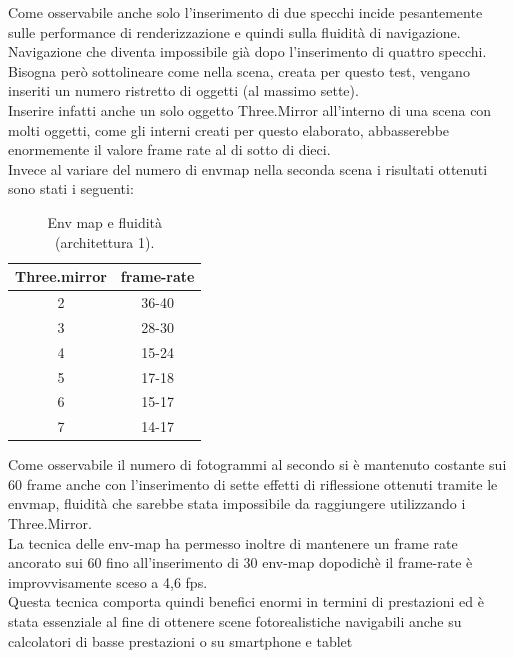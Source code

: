 Come osservabile anche solo l’inserimento di due specchi incide pesantemente sulle performance di renderizzazione e quindi sulla fluidità di navigazione.
\\
Navigazione che diventa impossibile già dopo l’inserimento di quattro specchi.
Bisogna però sottolineare come nella scena, creata per questo test, vengano inseriti un numero ristretto di oggetti (al massimo sette).
\\
Inserire infatti anche un solo oggetto Three.Mirror all’interno di una scena con molti oggetti, come gli interni creati per questo elaborato, abbasserebbe enormemente il valore frame rate al di sotto di dieci.
\\
Invece al variare del numero di envmap nella seconda scena i risultati ottenuti sono stati i seguenti:
\begin{table}[h]
\centering
\caption{Env map e fluidità (architettura 1).}
\begin{tabular}{|c|c|}
\hline
\textbf{Three.mirror} & \textbf{frame-rate} \\ \hline
2 & 36-40 \\ \hline
3 & 28-30 \\ \hline
4 & 15-24 \\ \hline
5 & 17-18 \\ \hline
6 & 15-17 \\ \hline
7 & 14-17 \\ \hline
\end{tabular}
\label{table:env-map}
\end{table}
Come osservabile il numero di fotogrammi al secondo si è mantenuto costante sui 60 frame anche con l’inserimento di sette effetti di riflessione ottenuti tramite le envmap, fluidità che sarebbe stata impossibile da raggiungere utilizzando i Three.Mirror.
\\
La tecnica delle env-map ha permesso inoltre di mantenere un frame rate ancorato sui 60 fino all’inserimento di 30 env-map dopodichè il frame-rate è improvvisamente sceso a 4,6 fps.
\\
Questa tecnica comporta quindi benefici enormi in termini di prestazioni ed è stata essenziale al fine di ottenere scene fotorealistiche navigabili anche su calcolatori di basse prestazioni o su smartphone e tablet
